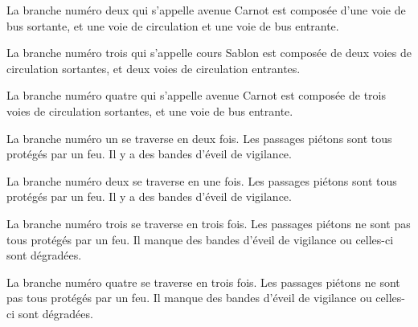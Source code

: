 \begin{appendix}

\newpar{}

La branche numéro deux qui s'appelle avenue Carnot est composée d'une voie de bus sortante, et une voie de circulation et une voie de bus entrante.


\newpar{}

La branche numéro trois qui s'appelle cours Sablon est composée de deux voies de circulation sortantes, et deux voies de circulation entrantes.

\newpar{}

La branche numéro quatre qui s'appelle avenue Carnot est composée de trois voies de circulation sortantes, et une voie de bus entrante.

\newpar{}

La branche numéro un se traverse en deux fois.  Les passages piétons sont tous protégés par un feu. Il y a des bandes d'éveil de vigilance.

\newpar{}

La branche numéro deux se traverse en une fois. Les passages piétons sont tous protégés par un feu. Il y a des bandes d'éveil de vigilance.

\newpar{}

La branche numéro trois se traverse en trois fois. Les passages piétons ne sont pas tous protégés par un feu. Il manque des bandes d'éveil de vigilance ou celles-ci sont dégradées.

\newpar{}

La branche numéro quatre se traverse en trois fois. Les passages piétons ne sont pas tous protégés par un feu. Il manque des bandes d'éveil de vigilance ou celles-ci sont dégradées.

\newpar{}


\end{appendix}